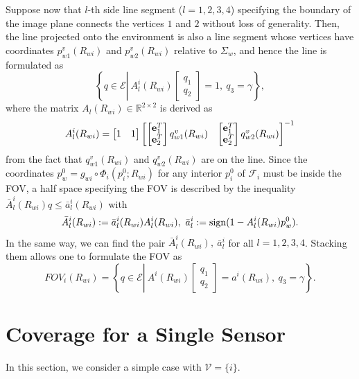 \documentclass[conference,letterpaper]{ieeeconf}
\newcommand{\V}{{\mathcal V}}
\newcommand{\E}{{\mathcal E}}
\newcommand{\F}{{\mathcal F}}
\newcommand{\R}{{\mathbb R}}
\newcommand{\ewi}{R_{wi}}
\begin{document}
Suppose now that $l$-th side line segment ($l = 1,2,3,4$) specifying 
the boundary of the image plane connects the vertices $1$ and $2$
without loss of generality.
Then, the line projected onto the environment is also a 
line segment whose vertices have coordinates 
${p}^{v}_{w1}(\ewi)$ and ${p}^{v}_{w2}(\ewi)$
relative to $\Sigma_w$, and hence the line is formulated as
\[
\left\{q \in \E\left|\ A^i_l(\ewi) 
\begin{bmatrix}
q_1\\
q_2
\end{bmatrix}
 = 1,\ q_3 = \gamma \right. \right\},
\]
where the matrix $A_l(\ewi) \in \R^{2 \times 2}$ is derived as
\[
A^i_l(\ewi) = \begin{bmatrix}
1& 1
\end{bmatrix}
\begin{bmatrix}
\begin{bmatrix}
{\bf e}_1^T\\
{\bf e}_2^T
\end{bmatrix}
{q}^{v}_{w1}(\ewi) &\begin{bmatrix}
{\bf e}_1^T\\
{\bf e}_2^T
\end{bmatrix} {q}^{v}_{w2}(\ewi)
\end{bmatrix}^{-1}
\]
from the fact that ${q}^{v}_{w1}(\ewi)$ and ${q}^{v}_{w2}(\ewi)$
are on the line.
Since the coordinates $p_w^0 = g_{wi}\circ \Phi_i(p_i^0; \ewi)$
for any interior $p_i^0$ of $\F_i$ must be inside the FOV,
a half space specifying the FOV is described by the inequality
$\bar A_l^i(\ewi) q \leq \bar a_l^i(\ewi)$ with
\[
\bar A_l^i(\ewi) := \bar a_l^i(\ewi)A_l^i(\ewi),\ 
\bar a_l^i := {\rm sign} (1 - A_l^i(\ewi)p_w^0).
\]
In the same way, we can find the pair $\bar A_l^i(\ewi),\ 
\bar a_l^i$ for all $l = 1,2,3,4$.
Stacking them allows one to formulate the FOV as
\[
FOV_i(\ewi) = 
\left\{q \in \E\left|\ A^i(\ewi) 
\begin{bmatrix}
q_1\\
q_2
\end{bmatrix}
 = a^i(\ewi),\ q_3 = \gamma \right. \right\}.
\]










\section{Coverage for a Single Sensor}


In this section, we consider a simple case with 
$\V = \{i\}$.
\end{document}
